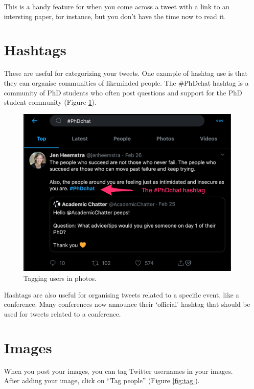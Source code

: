 \documentclass[]{book}
\begin{document}
This is a handy feature for when you come across a tweet with a link to an intersting paper, for instance, but you don't have the time now to read it.

\hypertarget{hashtags}{%
\section{Hashtags}\label{hashtags}}

These are useful for categorizing your tweets. One example of hashtag use is that they can organise communities of likeminded people. The \#PhDchat hashtag is a community of PhD students who often post questions and support for the PhD student community (Figure \ref{fig:hashtag}).

\begin{figure}

{\centering \includegraphics[width=0.8\linewidth]{images/hashtag} 

}

\caption{Tagging users in photos.}\label{fig:hashtag}
\end{figure}

Hashtags are also useful for organising tweets related to a specific event, like a conference. Many conferences now announce their `official' hashtag that should be used for tweets related to a conference.

\hypertarget{images}{%
\section{Images}\label{images}}

When you post your images, you can tag Twitter usernames in your images. After adding your image, click on ``Tag people'' (Figure \ref{fig:tag}).
\end{document}
